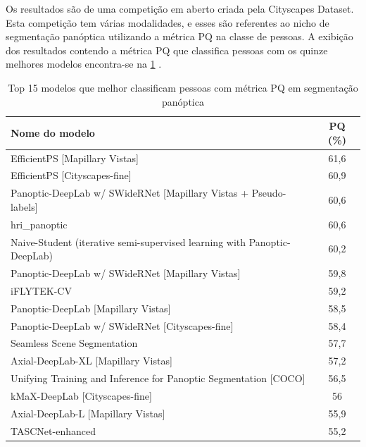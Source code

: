 
Os resultados são de uma competição em aberto criada pela Cityscapes Dataset. Esta competição tem várias modalidades, e esses são referentes ao nicho de segmentação panóptica utilizando a métrica PQ na classe de pessoas. A exibição dos resultados contendo a métrica PQ que classifica pessoas com os quinze melhores modelos encontra-se na \cref{tab:resultados-cityscapes} \space\cite{datasetResults}.
\begin{table}[h]
    \centering
    \caption{Top 15 modelos que melhor classificam pessoas com métrica PQ em segmentação panóptica}
    \label{tab:resultados-cityscapes}
    \begin{tabular}{|l|c|}
      \hline
      Nome do modelo & PQ (\%) \\
      \hline
      EfficientPS [Mapillary Vistas] & 61,6 \\
      EfficientPS [Cityscapes-fine] & 60,9 \\
      Panoptic-DeepLab w/ SWideRNet [Mapillary Vistas + Pseudo-labels] & 60,6 \\
      hri\_panoptic & 60,6 \\
      Naive-Student (iterative semi-supervised learning with Panoptic-DeepLab) & 60,2 \\
      Panoptic-DeepLab w/ SWideRNet [Mapillary Vistas] & 59,8 \\
      iFLYTEK-CV & 59,2 \\
      Panoptic-DeepLab [Mapillary Vistas] & 58,5 \\
      Panoptic-DeepLab w/ SWideRNet [Cityscapes-fine] & 58,4 \\
      Seamless Scene Segmentation & 57,7 \\
      Axial-DeepLab-XL [Mapillary Vistas] & 57,2 \\
      Unifying Training and Inference for Panoptic Segmentation [COCO] & 56,5 \\
      kMaX-DeepLab [Cityscapes-fine] & 56 \\
      Axial-DeepLab-L [Mapillary Vistas] & 55,9 \\
      TASCNet-enhanced & 55,2 \\
      \hline
    \end{tabular}
\end{table}




